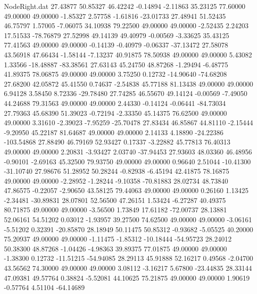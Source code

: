 \begin{filecontents}{NodeRight.dat}
  27.43877   50.85327   46.42242    -0.14894   -2.11863   35.23125   77.60000   49.00000   49.00000   -1.85327    2.57758   -1.61816  -23.01733
  27.48941   51.52435   46.75797     1.57005   -7.06075   34.10938   79.22500   49.00000   49.00000   -2.52435    2.24203   17.51533  -78.76879
  27.52998   49.14139   49.40979    -0.00569   -3.33625   35.43125   77.41563   49.00000   49.00000   -0.14139   -0.40979   -0.06337  -37.13472
  27.58078   43.56918   47.66434    -1.58144   -7.13237   40.91875   78.50938   49.00000   49.00000    5.43082    1.33566  -18.48887  -83.38561
  27.63143   45.24750   48.87268    -1.29494   -6.48775   41.89375   78.06875   49.00000   49.00000    3.75250    0.12732  -14.90640  -74.68208
  27.68200   42.05872   45.41550     0.74637   -2.54838   45.77188   81.13438   49.00000   49.00000    6.94128    3.58450    8.72336  -29.78480
  27.74285   46.55670   49.14124    -0.00569   -7.49050   44.24688   79.31563   49.00000   49.00000    2.44330   -0.14124   -0.06441  -84.73034
  27.79363   45.68390   51.39023    -0.72194   -2.33350   45.14375   76.62500   49.00000   49.00000    3.31610   -2.39023   -7.95259  -25.70478
  27.83434   46.85867   44.81110    -2.15444   -9.20950   45.22187   81.64687   49.00000   49.00000    2.14133    4.18890  -24.22386 -103.54868
  27.88490   46.79169   52.93427     0.17337   -3.22882   45.77813   76.40313   49.00000   49.00000    2.20831   -3.93427    2.03740  -37.94453
  27.93603   48.03360   46.48956    -0.90101   -2.69163   45.32500   79.93750   49.00000   49.00000    0.96640    2.51044  -10.41300  -31.10740
  27.98676   51.28952   50.28244    -0.82938   -6.45194   42.41875   78.16875   49.00000   49.00000   -2.28952   -1.28244   -9.10358  -70.81883
  28.02734   48.73840   47.86575    -0.22057   -2.90650   43.58125   79.44063   49.00000   49.00000    0.26160    1.13425   -2.34481  -30.89831
  28.07801   52.56500   47.26151     1.53424   -6.27287   40.49375   80.71875   49.00000   49.00000   -3.56500    1.73849   17.61182  -72.00737
  28.13881   52.06161   54.51202     0.03012   -1.93957   39.27500   74.62500   49.00000   49.00000   -3.06161   -5.51202    0.32391  -20.85870
  28.18949   50.11475   50.85312    -0.93682   -5.05525   40.20000   75.20937   49.00000   49.00000   -1.11475   -1.85312  -10.18444  -54.95723
  28.24012   50.38300   48.87268    -1.04426   -4.98363   39.89375   77.01875   49.00000   49.00000   -1.38300    0.12732  -11.51215  -54.94085
  28.29113   45.91888   52.16217     0.49568   -2.04700   43.56562   74.30000   49.00000   49.00000    3.08112   -3.16217    5.67800  -23.44835
  28.33144   47.09381   49.57764     0.38824   -5.52081   44.10625   75.21875   49.00000   49.00000    1.90619   -0.57764    4.51104  -64.14689

\end{filecontents}
